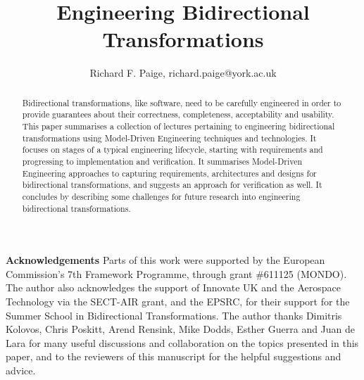 \documentclass[runningheads,a4paper]{llncs}
\begin{document}
\title{Engineering Bidirectional Transformations}

\author{
Richard F. Paige, richard.paige@york.ac.uk}
%

\maketitle

\begin{abstract}
Bidirectional transformations, like software, need to be carefully engineered in order to provide guarantees about their correctness, completeness, acceptability and usability. This paper summarises a collection of lectures pertaining to engineering bidirectional transformations using Model-Driven Engineering techniques and technologies. It focuses on stages of a typical engineering lifecycle, starting with requirements and progressing to implementation and verification. It summarises Model-Driven Engineering approaches to capturing requirements, architectures and designs for bidirectional transformations, and suggests an approach for verification as well. It concludes by describing some challenges for future research into engineering bidirectional transformations.
\end{abstract}













\vspace{4mm}

\noindent\textbf{Acknowledgements} Parts of this work were supported by the European Commission's 7th Framework Programme, through grant \#611125 (MONDO). The author also acknowledges the support of Innovate UK and the Aerospace Technology via the SECT-AIR grant, and the EPSRC, for their support for the Summer School in Bidirectional Transformations. The author thanks Dimitris Kolovos, Chris Poskitt, Arend Rensink, Mike Dodds, Esther Guerra and Juan de Lara for many useful discussions and collaboration on the topics presented in this paper, and to the reviewers of this manuscript for the helpful suggestions and advice.


\end{document}
